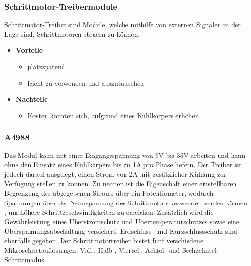\subsubsection{Schrittmotor-Treibermodule}
Schrittmotor-Treiber sind Module, welche mithilfe von externen Signalen in der Lage sind, Schrittmotoren steuern zu können.

\begin{itemize}
\item \textbf{Vorteile}
\begin{itemize}
\item platzsparend
\item leicht zu verwenden und auszutauschen
\end{itemize}
\item \textbf{Nachteile}
\begin{itemize}
\item Kosten könnten sich, aufgrund eines Kühlkörpers erhöhen
\end{itemize}
\end{itemize}

\subsubsection{A4988 }
Das Modul kann mit einer Eingangsspannung von 8V bis 35V arbeiten und kann ohne den Einsatz eines Kühlkörpers bis zu 1A pro Phase liefern.
Der Treiber ist jedoch darauf ausgelegt, einen Strom von 2A mit zusätzlicher Kühlung zur Verfügung stellen zu können.
Zu nennen ist die Eigenschaft einer einstellbaren Begrenzung des abgegebenen Stroms über ein Potentiometer,
wodurch Spannungen über der Nennspannung des Schrittmotors verwendet werden können , um höhere Schrittgeschwindigkeiten zu erreichen.
Zusätzlich wird die Gewährleistung eines Überstromschutz und Übertemperaturschutzes sowie eine Überspannungsabschaltung versichert.
Erdschluss- und Kurzschlussschutz sind ebenfalls gegeben.
Der Schrittmotortreiber bietet fünf verschiedene Mikroschrittauflösungen: Voll-, Halb-, Viertel-, Achtel- und Sechzehntel-Schrittmodus.

